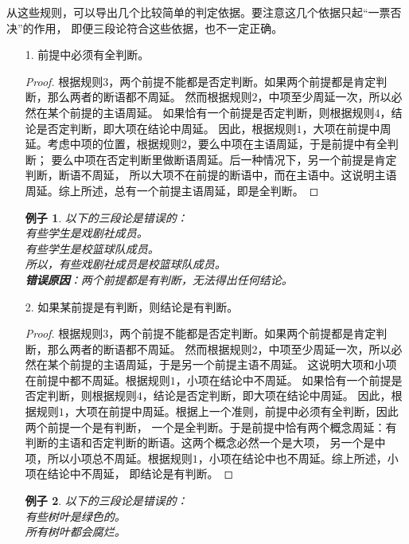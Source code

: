 \documentclass[12pt,UTF8]{ctexbook}
\newtheorem*{ex*}{例子}
\begin{document}
从这些规则，可以导出几个比较简单的判定依据。要注意这几个依据只起“一票否决”的作用，
即便三段论符合这些依据，也不一定正确。
\begin{enumerate}
    \item[1.] 前提中必须有全判断。
    \begin{proof}
        根据规则$3$，两个前提不能都是否定判断。如果两个前提都是肯定判断，那么两者的断语都不周延。
        然而根据规则$2$，中项至少周延一次，所以必然在某个前提的主语周延。
        如果恰有一个前提是否定判断，则根据规则$4$，结论是否定判断，即大项在结论中周延。
        因此，根据规则$1$，大项在前提中周延。考虑中项的位置，根据规则$2$，要么中项在主语周延，于是前提中有全判断；
        要么中项在否定判断里做断语周延。后一种情况下，另一个前提是肯定判断，断语不周延，
        所以大项不在前提的断语中，而在主语中。这说明主语周延。综上所述，总有一个前提主语周延，即是全判断。
    \end{proof}
    \begin{ex*}
        以下的三段论是错误的： \\
        \indent 有些学生是戏剧社成员。\\
        \indent 有些学生是校篮球队成员。\\
        \indent 所以，有些戏剧社成员是校篮球队成员。\\
        \textbf{错误原因}：两个前提都是有判断，无法得出任何结论。
    \end{ex*}
    \item[2.] 如果某前提是有判断，则结论是有判断。
    \begin{proof}
        根据规则$3$，两个前提不能都是否定判断。如果两个前提都是肯定判断，那么两者的断语都不周延。
        然而根据规则$2$，中项至少周延一次，所以必然在某个前提的主语周延，于是另一个前提主语不周延。
        这说明大项和小项在前提中都不周延。根据规则$1$，小项在结论中不周延。
        如果恰有一个前提是否定判断，则根据规则$4$，结论是否定判断，即大项在结论中周延。
        因此，根据规则$1$，大项在前提中周延。根据上一个准则，前提中必须有全判断，因此两个前提一个是有判断，
        一个是全判断。于是前提中恰有两个概念周延：有判断的主语和否定判断的断语。这两个概念必然一个是大项，
        另一个是中项，所以小项总不周延。根据规则$1$，小项在结论中也不周延。综上所述，小项在结论中不周延，
        即结论是有判断。
    \end{proof}
    \begin{ex*}
        以下的三段论是错误的： \\
        \indent 有些树叶是绿色的。\\
        \indent 所有树叶都会腐烂。\\

\end{ex*}
\end{enumerate}
\end{document}
